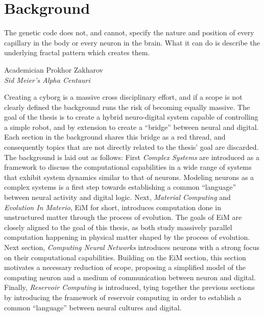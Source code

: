 \chapter{Background}
\epigraph{
The genetic code does not, and cannot, specify the nature and position of every
capillary in the body or every neuron in the brain. What it can do is describe
the underlying fractal pattern which creates them.}{Academician Prokhor
Zakharov \\\textit{Sid Meier's Alpha Centauri}}
Creating a cyborg is a massive cross disciplinary effort, and if a scope is not
clearly defined the background runs the risk of becoming equally massive.
The goal of the thesis is to create a hybrid neuro-digital system capable of
controlling a simple robot, and by extension to create a ``bridge'' between
neural and digital.
Each section in the background shares this bridge as a red thread, and
consequently topics that are not directly related to the thesis' goal are discarded.
The background is laid out as follows:
First \emph{Complex Systems} are introduced as a framework to discuss the computational
capabilities in a wide range of systems that exhibit system dynamics similar to
that of neurons.
Modeling neurons as a complex systems is a first step towards establishing a
common ``language'' between neural activity and digital logic.
%
Next, \emph{Material Computing} and \emph{Evolution In Materio}, EiM for short,
introduces computation done in unstructured matter through the process of
evolution. The goals of EiM are closely aligned to the goal of this thesis, as
both study massively parallel computation happening in physical matter shaped by
the process of evolution.
%
Next section, \emph{Computing Neural Networks} introduces neurons with a strong focus
on their computational capabilities.
Building on the EiM section, this section motivates a necessary reduction of
scope, proposing a simplified model of the computing neuron and a medium of
communication between neuron and digital.
%
Finally, \emph{Reservoir Computing} is introduced, tying together the previous
sections by introducing the framework of reservoir computing in order to
establish a common ``language'' between neural cultures and digital.
%
